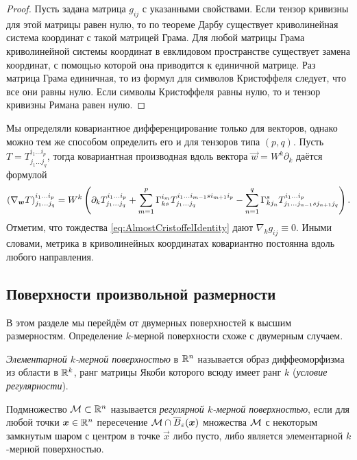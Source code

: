 \begin{proof}
	Пусть задана матрица $g_{ij}$ с указанными свойствами. Если тензор кривизны для этой матрицы равен нулю, то по теореме Дарбу существует криволинейная система координат с такой матрицей Грама. Для любой матрицы Грама криволинейной системы координат в евклидовом пространстве существует замена координат, с помощью которой она приводится к единичной матрице. Раз матрица Грама единичная, то из формул для символов Кристоффеля следует, что все они равны нулю. Если символы Кристоффеля равны нулю, то и тензор кривизны Римана равен нулю.
\end{proof}

Мы определяли ковариантное дифференцирование только для векторов, однако можно тем же способом определить его и для тензоров типа $(p, q)$. Пусть $T = T^{i_1 \ldots i_p}_{j_1 \ldots j_q}$, тогда ковариантная производная вдоль вектора $\vec{w} = W^k\partial_k$ даётся формулой
\[
	(\nabla_{\boldsymbol{w}}T)^{i_1 \ldots i_p}_{j_1 \ldots j_q} = W^k\left(\partial_kT^{i_1 \ldots i_p}_{j_1 \ldots j_q} + \sum_{m = 1}^p\Gamma_{ks}^{i_m}T^{i_1 \ldots i_{m - 1} s i_{m + 1} i_p}_{j_1 \ldots j_q} - \sum_{n = 1}^q\Gamma_{kj_n}^sT^{i_1 \ldots i_p}_{j_1 \ldots j_{n - 1} s j_{n + 1} j_q}\right).
\]
Отметим, что тождества \eqref{eq:AlmostCristoffelIdentity} дают $\nabla_kg_{ij} \equiv 0$. Иными словами, метрика в криволинейных координатах ковариантно постоянна вдоль любого направления.

\subsection{Поверхности произвольной размерности}

В этом разделе мы перейдём от двумерных поверхностей к высшим размерностям. Определение $k$-мерной поверхности схоже с двумерным случаем.

\begin{definition}
	\textit{Элементарной $k$-мерной поверхностью} в $\mathbb{R}^n$ называется образ диффеоморфизма из области в $\mathbb{R}^k$, ранг матрицы Якоби которого всюду имеет ранг $k$ (\textit{условие регулярности}).
\end{definition}

\begin{definition}
	Подмножество $\mathcal{M} \subset \mathbb{R}^n$ называется \textit{регулярной $k$-мерной поверхностью}, если для любой точки $\boldsymbol{x} \in \mathbb{R}^n$ пересечение $\mathcal{M} \cap \overline{B}_{\varepsilon}(\boldsymbol{x})$ множества $\mathcal{M}$ с некоторым замкнутым шаром с центром в точке $\vec{x}$ либо пусто, либо является элементарной $k$-мерной поверхностью.
\end{definition}

